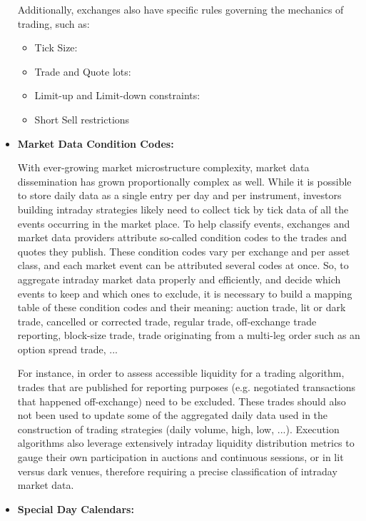 \begin{itemize}
\begin{itemize}
\end{itemize}

Additionally, exchanges also have specific rules governing the mechanics of trading, such as:
\begin{itemize}
\item Tick Size: 
\item Trade and Quote lots:
\item Limit-up and Limit-down constraints:
\item Short Sell restrictions
\end{itemize}

\item \textbf{Market Data Condition Codes:} 

With ever-growing market microstructure complexity, market data dissemination has grown proportionally complex as well. While it is possible to store daily data as a single entry per day and per instrument, investors building intraday strategies likely need to collect tick by tick data of all the events occurring in the market place. To help classify events, exchanges and market data providers attribute so-called condition codes to the trades and quotes they publish. These condition codes vary per exchange and per asset class, and each market event can be attributed several codes at once. So, to aggregate intraday market data properly and efficiently, and decide which events to keep and which ones to exclude, it is necessary to build a mapping table of these condition codes and their meaning: auction trade, lit or dark trade, cancelled or corrected trade, regular trade, off-exchange trade reporting, block-size trade, trade originating from a multi-leg order such as an option spread trade, ... 

For instance, in order to assess accessible liquidity for a trading algorithm, trades that are published for reporting purposes (e.g. negotiated transactions that happened off-exchange) need to be excluded. These trades should also not been used to update some of the aggregated daily data used in the construction of trading strategies (daily volume, high, low, ...). Execution algorithms also leverage extensively intraday liquidity distribution metrics to gauge their own participation in auctions and continuous sessions, or in lit versus dark venues, therefore requiring a precise classification of intraday market data. 

\item \textbf{Special Day Calendars:} 


\end{itemize}
